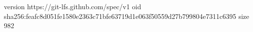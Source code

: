 version https://git-lfs.github.com/spec/v1
oid sha256:feafc8d051fe1580e2363c71bfe63719d1e063f50559d27b799804e7311c6395
size 982
